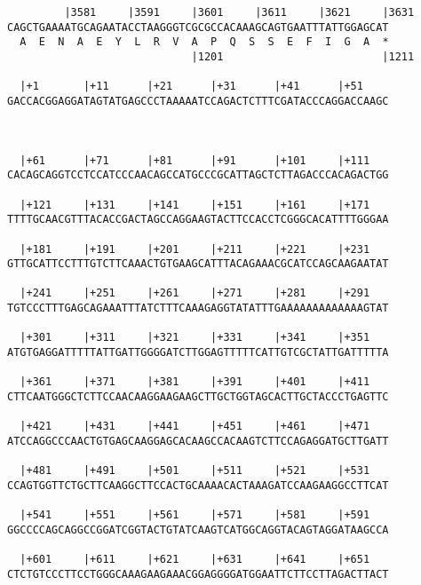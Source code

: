 \documentclass{article}
\begin{document}
\begin{Verbatim}
         |3581     |3591     |3601     |3611     |3621     |3631
CAGCTGAAAATGCAGAATACCTAAGGGTCGCGCCACAAAGCAGTGAATTTATTGGAGCAT
  A  E  N  A  E  Y  L  R  V  A  P  Q  S  S  E  F  I  G  A  *
                             |1201                         |1211
  
  |+1       |+11      |+21      |+31      |+41      |+51    
GACCACGGAGGATAGTATGAGCCCTAAAAATCCAGACTCTTTCGATACCCAGGACCAAGC
   
                                                            
  
  |+61      |+71      |+81      |+91      |+101     |+111   
CACAGCAGGTCCTCCATCCCAACAGCCATGCCCGCATTAGCTCTTAGACCCACAGACTGG
                                                            
  |+121     |+131     |+141     |+151     |+161     |+171   
TTTTGCAACGTTTACACCGACTAGCCAGGAAGTACTTCCACCTCGGGCACATTTTGGGAA
                                                            
  |+181     |+191     |+201     |+211     |+221     |+231   
GTTGCATTCCTTTGTCTTCAAACTGTGAAGCATTTACAGAAACGCATCCAGCAAGAATAT
                                                            
  |+241     |+251     |+261     |+271     |+281     |+291   
TGTCCCTTTGAGCAGAAATTTATCTTTCAAAGAGGTATATTTGAAAAAAAAAAAAAGTAT
                                                            
  |+301     |+311     |+321     |+331     |+341     |+351   
ATGTGAGGATTTTTATTGATTGGGGATCTTGGAGTTTTTCATTGTCGCTATTGATTTTTA
                                                            
  |+361     |+371     |+381     |+391     |+401     |+411   
CTTCAATGGGCTCTTCCAACAAGGAAGAAGCTTGCTGGTAGCACTTGCTACCCTGAGTTC
                                                            
  |+421     |+431     |+441     |+451     |+461     |+471   
ATCCAGGCCCAACTGTGAGCAAGGAGCACAAGCCACAAGTCTTCCAGAGGATGCTTGATT
                                                            
  |+481     |+491     |+501     |+511     |+521     |+531   
CCAGTGGTTCTGCTTCAAGGCTTCCACTGCAAAACACTAAAGATCCAAGAAGGCCTTCAT
                                                            
  |+541     |+551     |+561     |+571     |+581     |+591   
GGCCCCAGCAGGCCGGATCGGTACTGTATCAAGTCATGGCAGGTACAGTAGGATAAGCCA
                                                            
  |+601     |+611     |+621     |+631     |+641     |+651   
CTCTGTCCCTTCCTGGGCAAAGAAGAAACGGAGGGGATGGAATTCTTCCTTAGACTTACT
                                                            

\end{Verbatim}
\end{document}
